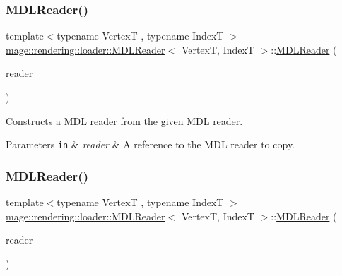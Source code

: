 \subsubsection{\texorpdfstring{M\+D\+L\+Reader()}{MDLReader()}\hspace{0.1cm}{\footnotesize\ttfamily [2/3]}}
{\footnotesize\ttfamily template$<$typename VertexT , typename IndexT $>$ \\
\hyperlink{classmage_1_1rendering_1_1loader_1_1_m_d_l_reader}{mage\+::rendering\+::loader\+::\+M\+D\+L\+Reader}$<$ VertexT, IndexT $>$\+::\hyperlink{classmage_1_1rendering_1_1loader_1_1_m_d_l_reader}{M\+D\+L\+Reader} (\begin{DoxyParamCaption}\item[{const \hyperlink{classmage_1_1rendering_1_1loader_1_1_m_d_l_reader}{M\+D\+L\+Reader}$<$ VertexT, IndexT $>$ \&}]{reader }\end{DoxyParamCaption})\hspace{0.3cm}{\ttfamily [delete]}}

Constructs a M\+DL reader from the given M\+DL reader.


\begin{DoxyParams}[1]{Parameters}
\mbox{\tt in}  & {\em reader} & A reference to the M\+DL reader to copy. \\
\hline
\end{DoxyParams}
\hypertarget{classmage_1_1rendering_1_1loader_1_1_m_d_l_reader_a77f5be43642636faf71e7fb3eed7e050}{}\label{classmage_1_1rendering_1_1loader_1_1_m_d_l_reader_a77f5be43642636faf71e7fb3eed7e050} 
\subsubsection{\texorpdfstring{M\+D\+L\+Reader()}{MDLReader()}\hspace{0.1cm}{\footnotesize\ttfamily [3/3]}}
{\footnotesize\ttfamily template$<$typename VertexT , typename IndexT $>$ \\
\hyperlink{classmage_1_1rendering_1_1loader_1_1_m_d_l_reader}{mage\+::rendering\+::loader\+::\+M\+D\+L\+Reader}$<$ VertexT, IndexT $>$\+::\hyperlink{classmage_1_1rendering_1_1loader_1_1_m_d_l_reader}{M\+D\+L\+Reader} (\begin{DoxyParamCaption}\item[{\hyperlink{classmage_1_1rendering_1_1loader_1_1_m_d_l_reader}{M\+D\+L\+Reader}$<$ VertexT, IndexT $>$ \&\&}]{reader }\end{DoxyParamCaption})\hspace{0.3cm}{\ttfamily [noexcept]}}

